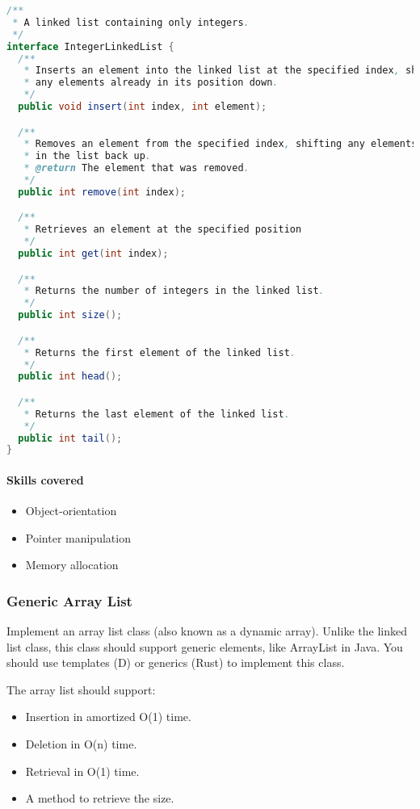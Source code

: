 \begin{lstlisting}[language=Java]
/**
 * A linked list containing only integers.
 */
interface IntegerLinkedList {
  /**
   * Inserts an element into the linked list at the specified index, shifting
   * any elements already in its position down.
   */
  public void insert(int index, int element);

  /**
   * Removes an element from the specified index, shifting any elements already
   * in the list back up.
   * @return The element that was removed.
   */
  public int remove(int index);

  /**
   * Retrieves an element at the specified position
   */
  public int get(int index);

  /**
   * Returns the number of integers in the linked list.
   */
  public int size();

  /**
   * Returns the first element of the linked list.
   */
  public int head();

  /**
   * Returns the last element of the linked list.
   */
  public int tail();
}
\end{lstlisting}

\paragraph{Skills covered}\label{skills-covered-1}

\begin{itemize}
\itemsep1pt\parskip0pt
\item
  Object-orientation
\item
  Pointer manipulation
\item
  Memory allocation
\end{itemize}

\subsubsection{Generic Array List}\label{generic-array-list}

Implement an array list class (also known as a dynamic array). Unlike
the linked list class, this class should support generic elements, like
ArrayList in Java. You should use templates (D) or generics (Rust) to
implement this class.

The array list should support:

\begin{itemize}
\itemsep1pt\parskip0pt
\item
  Insertion in amortized O(1) time.
\item
  Deletion in O(n) time.
\item
  Retrieval in O(1) time.
\item
  A method to retrieve the size.
\end{itemize}

